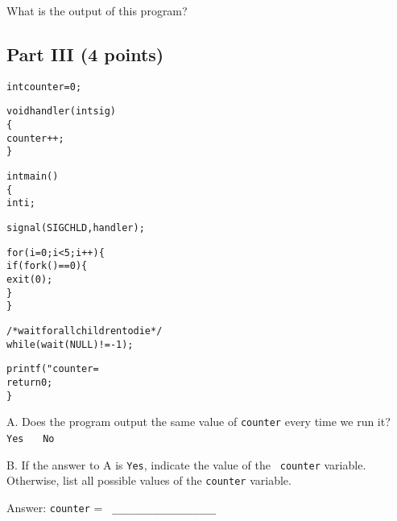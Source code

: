 \vspace{0.25in}

What is the output of this program?


\newpage
\subsection*{Part III (4 points)}
\begin{ccode}
\begin{alltt}
int counter = 0;

void handler(int sig)
\verb:{:
    counter ++;
\verb:}:


int  main()
\verb:{:
    int i;
    
    signal(SIGCHLD, handler);
    
    for (i = 0; i < 5; i ++)\verb:{:
        if (fork() == 0)\verb:{:
            exit(0);
        \verb:}:
    \verb:}:

    /* wait for all children to die */
    while (wait(NULL) != -1);
    
    printf("counter = %d\verb:\n:", counter);
    return 0;
\verb:}:
\end{alltt}
\end{ccode}

\vspace{0.30in}
A. Does the program output the same value of {\tt counter} every time we run it? \verb|  | {\tt Yes} \verb|  | {\tt No}

\vspace{0.25in}
B. If the answer to A is {\tt Yes}, indicate the value of the {\tt
counter} variable. Otherwise, list all possible values of the {\tt counter} variable. 

\vspace{0.15in}
Answer:  {\tt counter} =  \verb| __________________| 


%